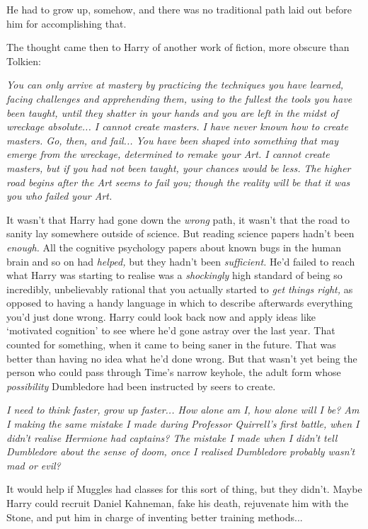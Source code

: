 He had to grow up, somehow, and there was no traditional path laid out before him for accomplishing that.

The thought came then to Harry of another work of fiction, more obscure than Tolkien:

\emph{You can only arrive at mastery by practicing the techniques you have learned, facing challenges and apprehending them, using to the fullest the tools you have been taught, until they shatter in your hands and you are left in the midst of wreckage absolute... I cannot create masters. I have never known how to create masters. Go, then, and fail... You have been shaped into something that may emerge from the wreckage, determined to remake your Art. I cannot create masters, but if you had not been taught, your chances would be less. The higher road begins after the Art seems to fail you; though the reality will be that it was you who failed your Art.}

It wasn't that Harry had gone down the \emph{wrong} path, it wasn't that the road to sanity lay somewhere outside of science. But reading science papers hadn't been \emph{enough.} All the cognitive psychology papers about known bugs in the human brain and so on had \emph{helped,} but they hadn't been \emph{sufficient.} He'd failed to reach what Harry was starting to realise was a \emph{shockingly} high standard of being so incredibly, unbelievably rational that you actually started to \emph{get things right,} as opposed to having a handy language in which to describe afterwards everything you'd just done wrong. Harry could look back now and apply ideas like `motivated cognition' to see where he'd gone astray over the last year. That counted for something, when it came to being saner in the future. That was better than having no idea what he'd done wrong. But that wasn't yet being the person who could pass through Time's narrow keyhole, the adult form whose \emph{possibility} Dumbledore had been instructed by seers to create.

\emph{I need to think faster, grow up faster... How alone am I, how alone will I be? Am I making the same mistake I made during Professor Quirrell's first battle, when I didn't realise Hermione had captains? The mistake I made when I didn't tell Dumbledore about the sense of doom, once I realised Dumbledore probably wasn't mad or evil?}

It would help if Muggles had classes for this sort of thing, but they didn't. Maybe Harry could recruit Daniel Kahneman, fake his death, rejuvenate him with the Stone, and put him in charge of inventing better training methods...

